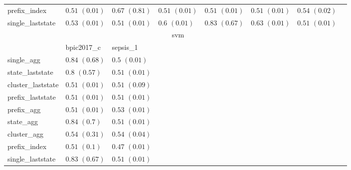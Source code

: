 \documentclass[twoside,11pt]{Latex/Classes/PhDthesisPSnPDF}
\begin{document}
\begin{table}[h]
{\begin{tabular}{llllllll}
			prefix\_index & $0.51$ ${(0.01)}$ & $0.67$ ${(0.81)}$ & $0.51$ ${(0.01)}$ & $0.51$ ${(0.01)}$ & $0.51$ ${(0.01)}$ & $0.54$ ${(0.02)}$ \\
			single\_laststate & $0.53$ ${(0.01)}$ & $0.51$ ${(0.01)}$ & $0.6$ ${(0.01)}$ & $0.83$ ${(0.67)}$ & $0.63$ ${(0.01)}$ & $0.51$ ${(0.01)}$ \\
			\bottomrule
			\toprule
			& \multicolumn{5}{c}{svm}
			\\
			& bpic2017\_c & sepsis\_1
			\\ \midrule
			single\_agg & $\mathbf{0.84}$ $\mathbf{(0.68)}$  & $0.5$ ${(0.01)}$ \\
			state\_laststate & $0.8$ ${(0.57)}$ & $0.51$ ${(0.01)}$ \\
			cluster\_laststate & $0.51$ ${(0.01)}$ & $0.51$ ${(0.09)}$ \\
			prefix\_laststate & $0.51$ ${(0.01)}$ & $0.51$ ${(0.01)}$ \\
			prefix\_agg & $0.51$ ${(0.01)}$ & $0.53$ ${(0.01)}$ \\
			state\_agg & $\mathbf{0.84}$ $\mathbf{(0.7)}$  & $0.51$ ${(0.01)}$ \\
			cluster\_agg & $0.54$ ${(0.31)}$ & $0.54$ ${(0.04)}$ \\
			prefix\_index & $0.51$ ${(0.1)}$ & $0.47$ ${(0.01)}$ \\
			single\_laststate & $0.83$ ${(0.67)}$ & $0.51$ ${(0.01)}$ \\
			\bottomrule
			
		\end{tabular}%
	}
\end{table}



\end{document}

